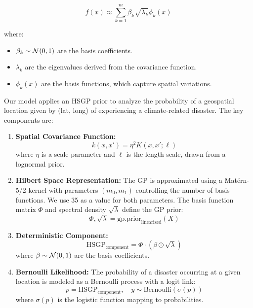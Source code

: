 \begin{equation}
f(x) \approx \sum_{k=1}^{m} \beta_k \sqrt{\lambda_k} \phi_k(x)
\end{equation}

where:
\begin{itemize}
    \item $\beta_k \sim \mathcal{N}(0,1)$ are the basis coefficients.
    \item $\lambda_k$ are the eigenvalues derived from the covariance function.
    \item $\phi_k(x)$ are the basis functions, which capture spatial variations.
\end{itemize}

Our model applies an HSGP prior to analyze the probability of a geospatial location given by (lat, long) of experiencing a climate-related disaster. The key components are:

\begin{enumerate}
    \item \textbf{Spatial Covariance Function:}
    \begin{equation}
    k(x, x') = \eta^2 K(x, x'; \ell)
    \end{equation}
    where $\eta$ is a scale parameter and $\ell$ is the length scale, drawn from a lognormal prior.

    \item \textbf{Hilbert Space Representation:}
    The GP is approximated using a Mat\'{e}rn-5/2 kernel with parameters $(m_0, m_1)$ controlling the number of basis functions. We use 35 as a value for both parameters. The basis function matrix $\Phi$ and spectral density $\sqrt{\lambda}$ define the GP prior:
    \begin{equation}
    \Phi, \sqrt{\lambda} = \text{gp.prior}_{\text{linearized}}(X)
    \end{equation}

    \item \textbf{Deterministic Component:}
    \begin{equation}
    \text{HSGP}_{\text{component}} = \Phi \cdot (\beta \odot \sqrt{\lambda})
    \end{equation}
    where $\beta \sim \mathcal{N}(0,1)$ are the basis coefficients.

    \item \textbf{Bernoulli Likelihood:}
    The probability of a disaster occurring at a given location is modeled as a Bernoulli process with a logit link:
    \begin{equation}
    p = \text{HSGP}_{\text{component}}, \quad y \sim \text{Bernoulli}(\sigma(p))
    \end{equation}
    where $\sigma(p)$ is the logistic function mapping to probabilities.
\end{enumerate}

